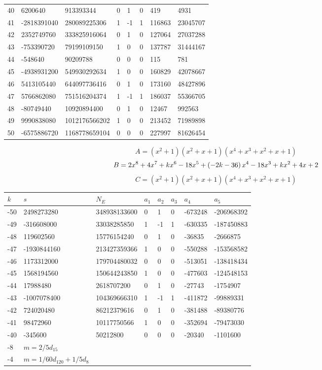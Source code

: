 \documentclass{amsart}
\begin{document}
\begin{longtable}{|l|l|l|lllll|}
40&6200640&913393344&0&1&0&419&4931\\
41&-2818391040&280089225306&1&-1&1&116863&23045707\\
42&2352749760&333825916064&0&1&0&127064&27037288\\
43&-753390720&79199109150&1&0&0&137787&31444167\\
44&-548640&90209788&0&0&0&115&781\\
45&-4938931200&549930292634&1&0&0&160829&42078667\\
46&5413105440&644097736416&0&1&0&173160&48427896\\
47&5766862080&751516204374&1&-1&1&186037&55366705\\
48&-80749440&10920894400&0&1&0&12467&992563\\
49&9990838080&1012176566202&1&0&0&213452&71989898\\
50&-6575886720&1168778659104&0&0&0&227997&81626454\\
\hline
\end{longtable}
$$A=(x^2
 + 1)(x^2
 + x
 + 1)(x^4
 + x^3
 + x^2
 + x
 + 1)$$
$$B=2\*x^8
 + 4\*x^7
 + k\*x^6
 - 18\*x^5
 + \left(-2\*k
 - 36\right) \*x^4
 - 18\*x^3
 + k\*x^2
 + 4\*x
 + 2$$
$$C=(x^2
 + 1)(x^2
 + x
 + 1)(x^4
 + x^3
 + x^2
 + x
 + 1)$$
\begin{longtable}{|l|l|l|lllll|}
\hline
$k$ & $s$ & $N_E$ & $a_1$ & $a_2$ & $a_3$ & $a_4$ & $a_5$\\
\hline
-50&2498273280&348938133600&0&1&0&-673248&-206968392\\
-49&-316608000&33038285850&1&-1&1&-630335&-187450883\\
-48&119602560&15776154240&0&1&0&-36835&-2666875\\
-47&-1930844160&213427359366&1&0&0&-550288&-153568582\\
-46&1173312000&179704480032&0&0&0&-513051&-138418434\\
-45&1568194560&150644243850&1&0&0&-477603&-124548153\\
-44&17988480&2618707200&0&1&0&-27743&-1754907\\
-43&-1007078400&104369666310&1&-1&1&-411872&-99889331\\
-42&724020480&86212379616&0&1&0&-381488&-89380776\\
-41&98472960&10117750566&1&0&0&-352694&-79473030\\
-40&-345600&50212800&0&0&0&-20340&-1101600\\
-8&$m=2/5d_{15}$&&\multicolumn{5}{c|}{}\\
-4&$m=1/60d_{120}+1/5d_{8}$&&\multicolumn{5}{c|}{}\\
\hline
\end{longtable}
\end{document}
